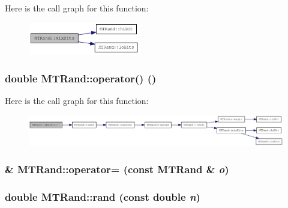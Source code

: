 Here is the call graph for this function:\nopagebreak
\begin{figure}[H]
\begin{center}
\leavevmode
\includegraphics[width=139pt]{classMTRand_abdd5587252ed1ac89cb274e4bf4881da_cgraph}
\end{center}
\end{figure}
\hypertarget{classMTRand_abbb87a08d622d58fdee0eea4cb5471a0}{
\subsubsection[{operator()}]{\setlength{\rightskip}{0pt plus 5cm}double MTRand::operator() ()}}
\label{classMTRand_abbb87a08d622d58fdee0eea4cb5471a0}


Here is the call graph for this function:\nopagebreak
\begin{figure}[H]
\begin{center}
\leavevmode
\includegraphics[width=420pt]{classMTRand_abbb87a08d622d58fdee0eea4cb5471a0_cgraph}
\end{center}
\end{figure}
\hypertarget{classMTRand_a3a6eb21add6f6ef4ce2d3280f2518521}{
\subsubsection[{operator=}]{ \& MTRand::operator= (const {\bf MTRand} \& {\em o})}}
\label{classMTRand_a3a6eb21add6f6ef4ce2d3280f2518521}
\hypertarget{classMTRand_aa4fe82fc27fd81414ce7554093a9766b}{
\subsubsection[{rand}]{\setlength{\rightskip}{0pt plus 5cm}double MTRand::rand (const double {\em n})}}
\label{classMTRand_aa4fe82fc27fd81414ce7554093a9766b}



